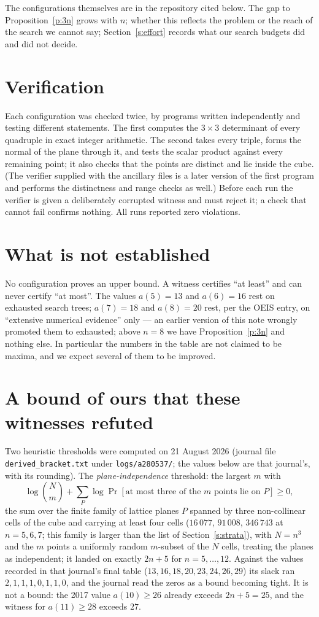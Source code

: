 \documentclass[11pt,a4paper]{article}
\begin{document}
The configurations themselves are in the repository cited below.  The gap to
Proposition~\ref{p:3n} grows with $n$; whether this reflects the problem or the reach of the
search we cannot say; Section~\ref{s:effort} records what our search budgets did and did not decide.

\section{Verification}
Each configuration was checked twice, by programs written independently and testing different
statements.  The first computes the $3\times3$ determinant of every quadruple in exact integer
arithmetic.  The second takes every triple, forms the normal of the plane through it, and tests
the scalar product against every remaining point; it also checks that the points are distinct
and lie inside the cube.  (The verifier supplied with the ancillary files is a later version of the
first program and performs the distinctness and range checks as well.)  Before each run the verifier is
given a deliberately corrupted witness and must reject it; a check that cannot fail confirms
nothing.  All runs reported zero violations.

\section{What is not established}\label{s:notest}
No configuration proves an upper bound.  A witness certifies ``at least'' and can never certify
``at most''.  The values $a(5)=13$ and $a(6)=16$ rest on exhausted search trees; $a(7)=18$ and
$a(8)=20$ rest, per the OEIS entry, on ``extensive numerical evidence'' only --- an earlier
version of this note wrongly promoted them to exhausted; above $n=8$ we have
Proposition~\ref{p:3n} and nothing else.  In particular the numbers
in the table are not claimed to be maxima, and we expect several of them to be improved.

\section{A bound of ours that these witnesses refuted}
Two heuristic thresholds were computed on 21 August 2026 (journal file \texttt{derived\_bracket.txt} under \texttt{logs/a280537/}; the
values below are that journal's, with its rounding).  The \emph{plane-independence} threshold: the largest $m$ with
\[\log\binom{N}{m}+\sum_P\log\Pr[\text{at most three of the $m$ points lie on }P]\ge0,\]
the sum over the finite family of lattice planes $P$ spanned by three non-collinear cells of the cube and carrying at least four
cells ($16\,077$, $91\,008$, $346\,743$ at $n=5,6,7$; this family is larger than the list of Section~\ref{s:strata}), with $N=n^3$ and
the $m$ points a uniformly random $m$-subset of the $N$ cells, treating the planes as independent; it landed on exactly $2n+5$ for $n=5,\dots,12$.  Against the values recorded in that journal's final table
($13,16,18,20,23,24,26,29$) its slack ran $2,1,1,1,0,1,1,0$, and the journal read the zeros as a bound becoming
tight.  It is not a bound: the 2017 value $a(10)\ge26$ already exceeds $2n+5=25$, and the witness for
$a(11)\ge28$ exceeds $27$.
\end{document}
